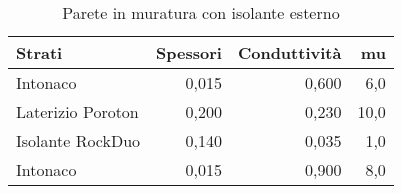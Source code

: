\begin{table}[H]
\centering
\caption{Parete in muratura con isolante esterno}
\begin{tabular}{lrrr}
\toprule
            Strati & Spessori & Conduttività  &    mu \\
\midrule
          Intonaco &    0,015 &                0,600 &   6,0 \\
 Laterizio Poroton &    0,200 &                0,230 &  10,0 \\
  Isolante RockDuo &    0,140 &                0,035 &   1,0 \\
          Intonaco &    0,015 &                0,900 &   8,0 \\
\bottomrule
\end{tabular}
\end{table}
